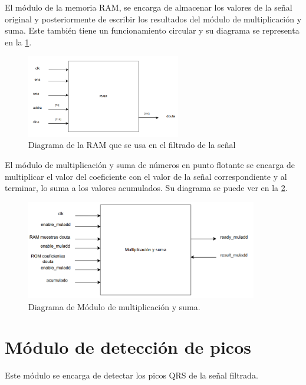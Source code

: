 El módulo de la memoria RAM, se encarga de almacenar los valores de la señal original y posteriormente de escribir los resultados del módulo de multiplicación y suma. Este también tiene un funcionamiento circular y su diagrama se representa en la \cref{fig:diagramamoduloRAM}.

\begin{figure}[h!]
    \centering
    \includegraphics[width=0.6\textwidth]{./Images/img_implementacion_hw/diagramamoduloRAM.png}
    \caption{Diagrama de la RAM que se usa en el filtrado de la señal}
    \label{fig:diagramamoduloRAM}
\end{figure} 
\FloatBarrier

El módulo de multiplicación y suma de números en punto flotante se encarga de multiplicar el valor del coeficiente con el valor de la señal correspondiente y al terminar, lo suma a los valores acumulados. Su diagrama se puede ver en la \cref{fig:diagramamodulomultiplicacionysuma}.
\begin{figure}[h!]
    \centering
    \includegraphics[width=0.9\textwidth]{./Images/img_implementacion_hw/diagramamodulomultiplicacionysuma.png}
    \caption{Diagrama de Módulo de multiplicación y suma.}
    \label{fig:diagramamodulomultiplicacionysuma}
\end{figure}
\FloatBarrier
\section{Módulo de detección de picos}

Este módulo se encarga de detectar los picos QRS de la señal filtrada.
